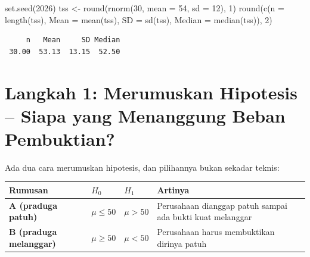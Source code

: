 \documentclass[
  indonesian,
  letterpaper,
]{book}
\newenvironment{Shaded}{\begin{snugshade}}{\end{snugshade}}
\newcommand{\AttributeTok}[1]{\textcolor[rgb]{0.40,0.45,0.13}{#1}}
\newcommand{\DecValTok}[1]{\textcolor[rgb]{0.68,0.00,0.00}{#1}}
\newcommand{\FunctionTok}[1]{\textcolor[rgb]{0.28,0.35,0.67}{#1}}
\newcommand{\NormalTok}[1]{\textcolor[rgb]{0.00,0.23,0.31}{#1}}
\newcommand{\OtherTok}[1]{\textcolor[rgb]{0.00,0.23,0.31}{#1}}
\newcounter{none} %
\begin{document}
\begin{Shaded}
\begin{Highlighting}[]
\FunctionTok{set.seed}\NormalTok{(}\DecValTok{2026}\NormalTok{)}
\NormalTok{tss }\OtherTok{\textless{}{-}} \FunctionTok{round}\NormalTok{(}\FunctionTok{rnorm}\NormalTok{(}\DecValTok{30}\NormalTok{, }\AttributeTok{mean =} \DecValTok{54}\NormalTok{, }\AttributeTok{sd =} \DecValTok{12}\NormalTok{), }\DecValTok{1}\NormalTok{)}
\FunctionTok{round}\NormalTok{(}\FunctionTok{c}\NormalTok{(}\AttributeTok{n =} \FunctionTok{length}\NormalTok{(tss), }\AttributeTok{Mean =} \FunctionTok{mean}\NormalTok{(tss), }\AttributeTok{SD =} \FunctionTok{sd}\NormalTok{(tss), }\AttributeTok{Median =} \FunctionTok{median}\NormalTok{(tss)), }\DecValTok{2}\NormalTok{)}
\end{Highlighting}
\end{Shaded}

\begin{verbatim}
     n   Mean     SD Median 
 30.00  53.13  13.15  52.50 
\end{verbatim}

\section{Langkah 1: Merumuskan Hipotesis -- Siapa yang Menanggung Beban
Pembuktian?}\label{langkah-1-merumuskan-hipotesis-siapa-yang-menanggung-beban-pembuktian}

Ada dua cara merumuskan hipotesis, dan pilihannya bukan sekadar teknis:

{\def\LTcaptype{none} %
\begin{longtable}[]{@{}
  >{\raggedright\arraybackslash}p{}
  >{\raggedright\arraybackslash}p{}
  >{\raggedright\arraybackslash}p{}
  >{\raggedright\arraybackslash}p{}@{}}
\toprule\noalign{}
\begin{minipage}[b]{\linewidth}\raggedright
Rumusan
\end{minipage} & \begin{minipage}[b]{\linewidth}\raggedright
\(H_0\)
\end{minipage} & \begin{minipage}[b]{\linewidth}\raggedright
\(H_1\)
\end{minipage} & \begin{minipage}[b]{\linewidth}\raggedright
Artinya
\end{minipage} \\
\midrule\noalign{}
\endhead
\bottomrule\noalign{}
\endlastfoot
\textbf{A (praduga patuh)} & \(\mu \le 50\) & \(\mu > 50\) & Perusahaan
dianggap patuh sampai ada bukti kuat melanggar \\
\textbf{B (praduga melanggar)} & \(\mu \ge 50\) & \(\mu < 50\) &
Perusahaan harus membuktikan dirinya patuh \\
\end{longtable}
}
\end{document}
